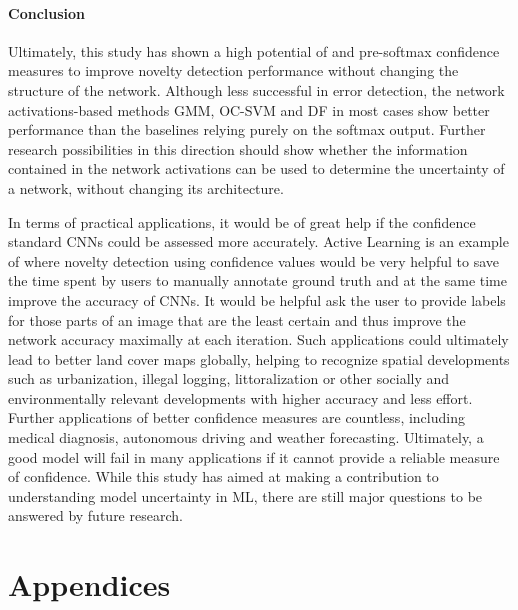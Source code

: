 \documentclass[10pt]{article}
\begin{document}
\paragraph{Conclusion} Ultimately, this study has shown a high potential of  and pre-softmax confidence measures to improve novelty detection performance without changing the structure of the network. Although less successful in error detection, the network activations-based methods \gls{GMM}, \gls{OC-SVM} and \gls{DF} in most cases show better performance than the baselines relying purely on the softmax output. Further research possibilities in this direction should show whether the information contained in the network activations can be used to determine the uncertainty of a network, without changing its architecture.

In terms of practical applications, it would be of great help if the confidence standard CNNs could be assessed more accurately. Active Learning is an example of where novelty detection using confidence values would be very helpful to save the time spent by users to manually annotate ground truth and at the same time improve the accuracy of CNNs. It would be helpful ask the user to provide labels for those parts of an image that are the least certain and thus improve the network accuracy maximally at each iteration. Such applications could ultimately lead to better land cover maps globally, helping to recognize spatial developments such as urbanization, illegal logging, littoralization or other socially and environmentally relevant developments with higher accuracy and less effort. Further applications of better confidence measures are countless, including medical diagnosis, autonomous driving and weather forecasting. Ultimately, a good model will fail in many applications if it cannot provide a reliable measure of confidence. While this study has aimed at making a contribution to understanding model uncertainty in \gls{ML}, there are still major questions to be answered by future research.

\newpage
\printbibliography


\newpage
\renewcommand{\thesubsection}{\Alph{subsection}}
\pagebreak  

\section{Appendices}
\end{document}
